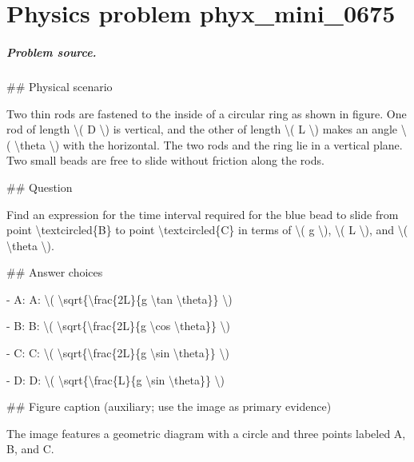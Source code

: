 
\chapter{Physics problem phyx\_mini\_0675}
\label{ch:PhyXMiniProblems_problem_phyx_mini_0675}

\paragraph{Problem source.}
\#\# Physical scenario

Two thin rods are fastened to the inside of a circular ring as shown in figure. One rod of length \textbackslash{}( D \textbackslash{}) is vertical, and the other of length \textbackslash{}( L \textbackslash{}) makes an angle \textbackslash{}( \textbackslash{}theta \textbackslash{}) with the horizontal. The two rods and the ring lie in a vertical plane. Two small beads are free to slide without friction along the rods.

\#\# Question

Find an expression for the time interval required for the blue bead to slide from point \textbackslash{}textcircled\{B\} to point \textbackslash{}textcircled\{C\} in terms of \textbackslash{}( g \textbackslash{}), \textbackslash{}( L \textbackslash{}), and \textbackslash{}( \textbackslash{}theta \textbackslash{}).

\#\# Answer choices

- A: A: \textbackslash{}( \textbackslash{}sqrt\{\textbackslash{}frac\{2L\}\{g \textbackslash{}tan \textbackslash{}theta\}\} \textbackslash{})

- B: B: \textbackslash{}( \textbackslash{}sqrt\{\textbackslash{}frac\{2L\}\{g \textbackslash{}cos \textbackslash{}theta\}\} \textbackslash{})

- C: C: \textbackslash{}( \textbackslash{}sqrt\{\textbackslash{}frac\{2L\}\{g \textbackslash{}sin \textbackslash{}theta\}\} \textbackslash{})

- D: D: \textbackslash{}( \textbackslash{}sqrt\{\textbackslash{}frac\{L\}\{g \textbackslash{}sin \textbackslash{}theta\}\} \textbackslash{})

\#\# Figure caption (auxiliary; use the image as primary evidence)

The image features a geometric diagram with a circle and three points labeled A, B, and C. 

